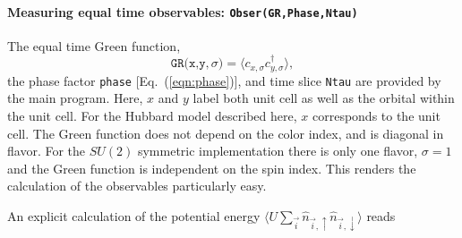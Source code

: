 \documentclass{SciPost}
\begin{document}
\paragraph{Measuring equal time observables: \texttt{Obser(GR,Phase,Ntau)}}
%
The equal time  Green function,
\begin{equation}
	 \texttt{GR(x,y},\sigma{\texttt)}  = \langle c^{\phantom{\dagger}}_{x,\sigma} c^{\dagger}_{y,\sigma}  \rangle,
\end{equation}
the  phase factor \texttt{phase} [Eq.~(\ref{eqn:phase})], and time slice \texttt{Ntau}   are provided by the main program.  
Here, $x$ and $y$ label  both unit cell as well as the orbital within the unit cell. For the Hubbard model described here, $x$ corresponds to the unit cell.  The Green function  does not depend on the color index, and is diagonal in flavor.  For the $SU(2)$ symmetric implementation  there is only one flavor, $\sigma = 1$ and the Green function is  independent on the spin index.  This renders the calculation of the observables particularly easy.   

An explicit calculation of the   potential energy  $ \langle U \sum_{\vec{i}}  \hat{n}_{\vec{i},\uparrow}   \hat{n}_{\vec{i},\downarrow}  \rangle $ reads 
\end{document}

